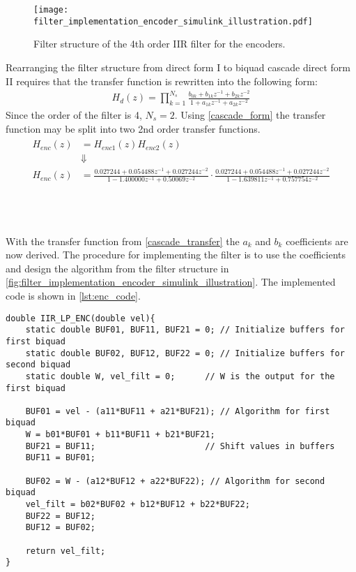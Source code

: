 \begin{figure}[H]
    \centering
    \texttt{[image: filter\_implementation\_encoder\_simulink\_illustration.pdf]}
    \caption{Filter structure of the 4th order IIR filter for the encoders.}
    \label{fig:filter_implementation_encoder_simulink_illustration}
\end{figure} 
Rearranging the filter structure from direct form I to biquad cascade direct form II requires that the transfer function is rewritten into the following form\citep[p. 409]{oppenheim}:
\begin{align}
H_d(z) = \prod\limits_{k=1}^{N_s}\frac{b_{0k}+b_{1k}z^{-1}+b_{2k}z^{-2}}{1+a_{1k}z^{-1}+a_{2k}z^{-2}}
\label{cascade_form}
\end{align}
Since the order of the filter is 4, $N_s = 2$. Using \autoref{cascade_form} the transfer function may be split into two 2nd order transfer functions.
\begin{align}
\begin{split}
H_{enc}(z) 	&= H_{enc1}(z)H_{enc2}(z) \\
		&\Downarrow \\
H_{enc}(z) 	&= \frac{0.027244+0.054488z^{-1}+0.027244z^{-2}}{1-1.400000z^{-1}+0.50069z^{-2}} \cdot \frac{0.027244+0.054488z^{-1} + 0.027244z^{-2}}{1 - 1.639811z^{-1} + 0.757754z^{-2}}
\end{split}
\label{cascade_transfer}
\end{align}
\begin{where}
\\
\\
\end{where}

With the transfer function from \autoref{cascade_transfer} the $a_k$ and $b_k$ coefficients are now derived. The procedure for implementing the filter is to use the coefficients and design the algorithm from the filter structure in \autoref{fig:filter_implementation_encoder_simulink_illustration}. The implemented code is shown in \autoref{lst:enc_code}.\newpage

\begin{lstlisting}
double IIR_LP_ENC(double vel){
	static double BUF01, BUF11, BUF21 = 0; // Initialize buffers for first biquad
	static double BUF02, BUF12, BUF22 = 0; // Initialize buffers for second biquad
	static double W, vel_filt = 0;		// W is the output for the first biquad
								
	BUF01 = vel - (a11*BUF11 + a21*BUF21); // Algorithm for first biquad
	W = b01*BUF01 + b11*BUF11 + b21*BUF21;
	BUF21 = BUF11;						// Shift values in buffers
	BUF11 = BUF01;

	BUF02 = W - (a12*BUF12 + a22*BUF22); // Algorithm for second biquad
	vel_filt = b02*BUF02 + b12*BUF12 + b22*BUF22;
	BUF22 = BUF12;
	BUF12 = BUF02;
	
	return vel_filt;
}
\end{lstlisting}

